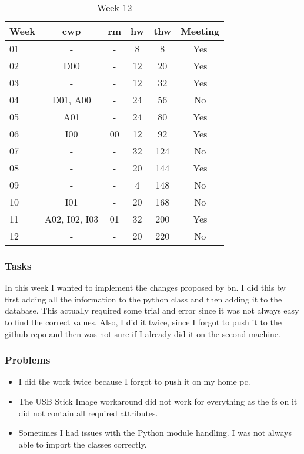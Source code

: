 \begin{table}[!ht]
    \begin{center}
        \caption{Week 12}
        \label{tab:journal:week12}
        \begin{tabular}{l|c|c|c|c|c}
            \textbf{Week} & \textbf{\gls{cwp}} & \textbf{\gls{rm}} & \textbf{\gls{hw}} & \textbf{\gls{thw}} & \textbf{Meeting}\\
        \hline
        01 & - & - & 8 & 8 & Yes \\
        02 & D00 & - & 12 & 20 & Yes \\
        03 & - & - & 12 & 32 & Yes \\
        04 & D01, A00 & - & 24 & 56 & No \\
        05 & A01 & - & 24 & 80 & Yes \\
        06 & I00 & 00 & 12 & 92 & Yes \\
        07 & - & - & 32 & 124 & No \\
        08 & - & - & 20 & 144 & Yes \\
        09 & - & - & 4 & 148 & No \\
        10 & I01 & - & 20 & 168 & No \\
        11 & A02, I02, I03 & 01 & 32 & 200 & Yes \\
        12 & - & - & 20 & 220 & No \\
        \end{tabular}
    \end{center}
\end{table}

\subsubsection{Tasks}

In this week I wanted to implement the changes proposed by \gls{bn}. I did this by first adding all the information to the python class and then adding it to the database. This actually required some trial and error since it was not always easy to find the correct values. Also, I did it twice, since I forgot to push it to the github repo and then was not sure if I already did it on the second machine. 

\subsubsection{Problems}

\begin{itemize}
    \item I did the work twice because I forgot to push it on my home pc.
    \item The USB Stick Image workaround did not work for everything as the \gls{fs} on it did not contain all required attributes.
    \item Sometimes I had issues with the Python module handling. I was not always able to import the classes correctly.
\end{itemize}

